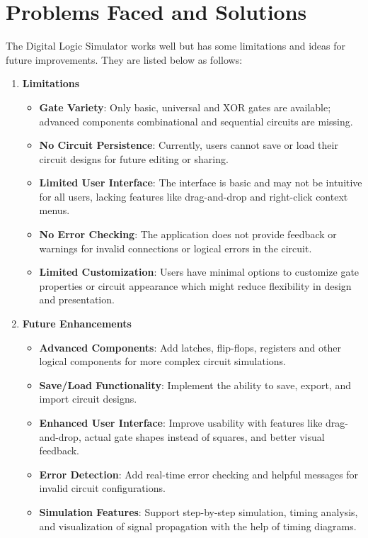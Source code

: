 \section{Problems Faced and Solutions}
The Digital Logic Simulator works well but has some limitations and ideas for future improvements. They are listed below as follows:

\begin{enumerate}
    \item \textbf{Limitations}
          \begin{itemize}
              \item \textbf{Gate Variety}: Only basic, universal and XOR gates are available; advanced components combinational and sequential circuits are missing.
              \item \textbf{No Circuit Persistence}: Currently, users cannot save or load their circuit designs for future editing or sharing.
              \item \textbf{Limited User Interface}: The interface is basic and may not be intuitive for all users, lacking features like drag-and-drop and right-click context menus.
              \item \textbf{No Error Checking}: The application does not provide feedback or warnings for invalid connections or logical errors in the circuit.
              \item \textbf{Limited Customization}: Users have minimal options to customize gate properties or circuit appearance which might reduce flexibility in design and presentation.
          \end{itemize}
    \item \textbf{Future Enhancements}
          \begin{itemize}
              \item \textbf{Advanced Components}: Add latches, flip-flops, registers and other logical components for more complex circuit simulations.
              \item \textbf{Save/Load Functionality}: Implement the ability to save, export, and import circuit designs.
              \item \textbf{Enhanced User Interface}: Improve usability with features like drag-and-drop, actual gate shapes instead of squares, and better visual feedback.
              \item \textbf{Error Detection}: Add real-time error checking and helpful messages for invalid circuit configurations.
              \item \textbf{Simulation Features}: Support step-by-step simulation, timing analysis, and visualization of signal propagation with the help of timing diagrams.
          \end{itemize}
\end{enumerate}

\clearpage
